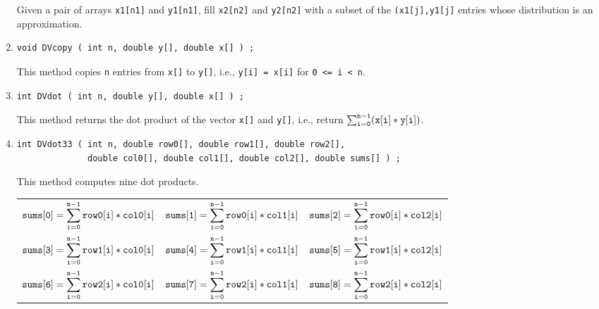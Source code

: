 \begin{enumerate}
\begin{verbatim}
\end{verbatim}
Given a pair of arrays {\tt x1[n1]} and {\tt y1[n1]},
fill {\tt x2[n2]} and {\tt y2[n2]} with a subset of the
{\tt (x1[j],y1[j]} entries whose distribution is an approximation.
\item
\begin{verbatim}
void DVcopy ( int n, double y[], double x[] ) ;
\end{verbatim}
This method copies {\tt n} entries from {\tt x[]} to {\tt y[]},
i.e.,
{\tt y[i] = x[i]} for {\tt 0 <= i < n}.
\item
\begin{verbatim}
int DVdot ( int n, double y[], double x[] ) ;
\end{verbatim}
This method returns the dot product of the vector {\tt x[]} and
{\tt y[]},
i.e., return
$\sum_{\tt i = 0}^{\tt n-1} ({\tt x[i] * y[i]})$.
\item
\begin{verbatim}
int DVdot33 ( int n, double row0[], double row1[], double row2[], 
              double col0[], double col1[], double col2[], double sums[] ) ;
\end{verbatim}
This method computes nine dot products.
\par
\begin{tabular}{lll}
$\displaystyle{\tt sums[0]}
               = \sum_{\tt i = 0}^{\tt n-1} {\tt row0[i] * col0[i]}$ &
$\displaystyle{\tt sums[1]}
               = \sum_{\tt i = 0}^{\tt n-1} {\tt row0[i] * col1[i]}$ &
$\displaystyle{\tt sums[2]}
               = \sum_{\tt i = 0}^{\tt n-1} {\tt row0[i] * col2[i]}$ \\
$\displaystyle{\tt sums[3]}
               = \sum_{\tt i = 0}^{\tt n-1} {\tt row1[i] * col0[i]}$ &
$\displaystyle{\tt sums[4]}
               = \sum_{\tt i = 0}^{\tt n-1} {\tt row1[i] * col1[i]}$ &
$\displaystyle{\tt sums[5]}
               = \sum_{\tt i = 0}^{\tt n-1} {\tt row1[i] * col2[i]}$ \\
$\displaystyle{\tt sums[6]}
               = \sum_{\tt i = 0}^{\tt n-1} {\tt row2[i] * col0[i]}$ &
$\displaystyle{\tt sums[7]}
               = \sum_{\tt i = 0}^{\tt n-1} {\tt row2[i] * col1[i]}$ &
$\displaystyle{\tt sums[8]}
               = \sum_{\tt i = 0}^{\tt n-1} {\tt row2[i] * col2[i]}$ 

\end{tabular}
\end{enumerate}
